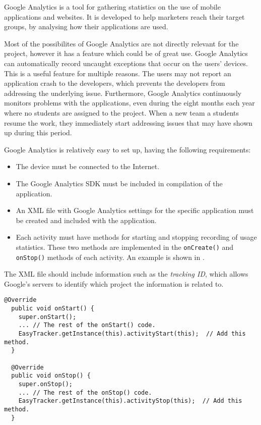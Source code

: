 Google Analytics is a tool for gathering statistics on the use of mobile applications and websites. 
It is developed to help marketers reach their target groups, by analysing how their applications are used.

Most of the possibilites of Google Analytics are not directly relevant for the \giraf project, however it has a feature which could be of great use.
Google Analytics can automatically record uncaught exceptions that occur on the users' devices.
This is a useful feature for multiple reasons. The users may not report an application crash to the developers, which prevents the developers from addressing the underlying issue. Furthermore, Google Analytics continuously monitors problems with the applications, even during the eight months each year where no students are assigned to the project. When a new team a students resume the work, they immediately start addressing issues that may have shown up during this period.

Google Analytics is relatively easy to set up, having the following requirements:
\begin{itemize}
\item The device must be connected to the Internet.
\item The Google Analytics SDK must be included in compilation of the application.
\item An XML file with Google Analytics settings for the specific application must be created and included with the application.
\item Each activity must have methods for starting and stopping recording of usage statistics. These two methods are implemented in the \lstinline{onCreate()} and \lstinline{onStop()} methods of each activity. An example is shown in .
\end{itemize}
The XML file should include information such as the \textit{tracking ID}, which allows Google's servers to identify which project the information is related to.

\begin{lstlisting}[caption={The code that needs to be added to \lstinline{OnCreate()} and \lstinline{OnStop()} methods.}, label={lst:googleanalystics}]
  @Override
  public void onStart() {
    super.onStart();
    ... // The rest of the onStart() code.
    EasyTracker.getInstance(this).activityStart(this);  // Add this method.
  }

  @Override
  public void onStop() {
    super.onStop();
    ... // The rest of the onStop() code.
    EasyTracker.getInstance(this).activityStop(this);  // Add this method.
  }
\end{lstlisting}

